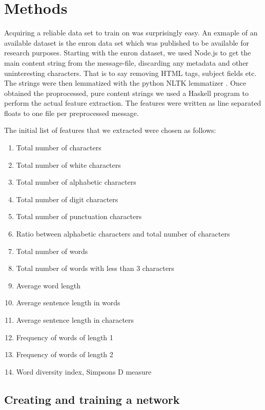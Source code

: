 
\section{Methods}

  Acquiring a reliable data set to train on was surprisingly easy. An
  exmaple of an available dataset is the enron data set \cite{enron} which was
  published to be available for research purposes. Starting with the enron
  dataset, we used Node.js to get the main content string from the
  message-file, discarding any metadata and other uninteresting characters.
  That is to say removing HTML tags, subject fields etc. The strings were then
  lemmatized with the python NLTK lemmatizer \cite{nltk}. Once obtained the
  proprocessed, pure content strings we used a Haskell program to perform the
  actual feature extraction. The features were written as line separated floats
  to one file per preprocessed message.

  The initial list of features that we extracted were chosen as follows:
  \begin{enumerate}
    \item Total number of characters
    \item Total number of white characters 
    \item Total number of alphabetic characters
    \item Total number of digit characters
    \item Total number of punctuation characters
    \item Ratio between alphabetic characters and total number of characters
    \item Total number of words
    \item Total number of words with less than 3 characters
    \item Average word length 
    \item Average sentence length in words
    \item Average sentence length in characters
    \item Frequency of words of length 1
    \item Frequency of words of length 2
    \item Word diversity index, Simpsons D measure \cite{simpsons-measure}
  \end{enumerate}
    
  \subsection{Creating and training a network}
    

